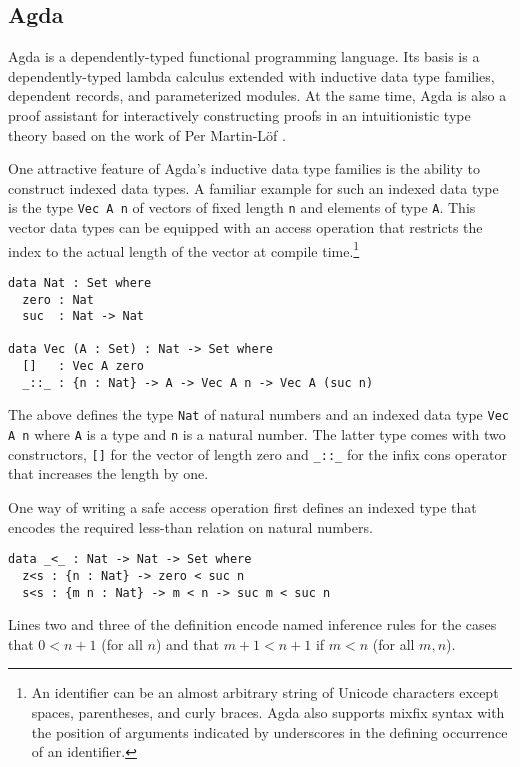 \documentclass{llncs}
\begin{document}
\subsection{Agda}
\label{sec:agda}

Agda \cite{Norell2008,BoveDybjerNorell2009} is a dependently-typed
functional programming language. Its basis is a dependently-typed
lambda calculus extended with inductive data type families, dependent
records, and parameterized modules. At the same time, Agda is also a
proof assistant for interactively constructing proofs in an
intuitionistic type theory based on the work of Per Martin-L\"of
\cite{MartinLoef1984}. 

One attractive feature of Agda's inductive data type families is the
ability to construct indexed data types.
A familiar example for such an indexed data type is the type
\verb+Vec A n+ of vectors of fixed length \verb+n+ and elements of
type \verb+A+. This vector data types can be equipped with an access
operation that restricts the index to the 
actual length of the vector at compile time.\footnote{An
  identifier can be an almost arbitrary 
  string of Unicode characters except spaces, parentheses, and curly
  braces. Agda also supports mixfix syntax with the position of
  arguments indicated by underscores in the defining occurrence of an
  identifier.} 
\begin{verbatim}
data Nat : Set where
  zero : Nat
  suc  : Nat -> Nat

data Vec (A : Set) : Nat -> Set where
  []   : Vec A zero
  _::_ : {n : Nat} -> A -> Vec A n -> Vec A (suc n)
\end{verbatim}
The above defines the type \verb+Nat+ of natural numbers and an
indexed data type \verb+Vec A n+ where \texttt{A} is a type and
\texttt{n} is a natural number. The latter type comes with two 
constructors, \verb+[]+ for the vector of length zero and 
\verb+_::_+ for the infix cons operator that increases the length by one.

One way of writing a safe access operation first defines an indexed
type that encodes the required less-than relation on natural numbers.
\begin{verbatim}
data _<_ : Nat -> Nat -> Set where
  z<s : {n : Nat} -> zero < suc n
  s<s : {m n : Nat} -> m < n -> suc m < suc n
\end{verbatim}
Lines two and three of the definition encode named inference rules for
the cases that $0 < n+1$ (for all $n$) and that $m+1 < n+1$ if $m < n$
(for all $m,n$).
\end{document}
